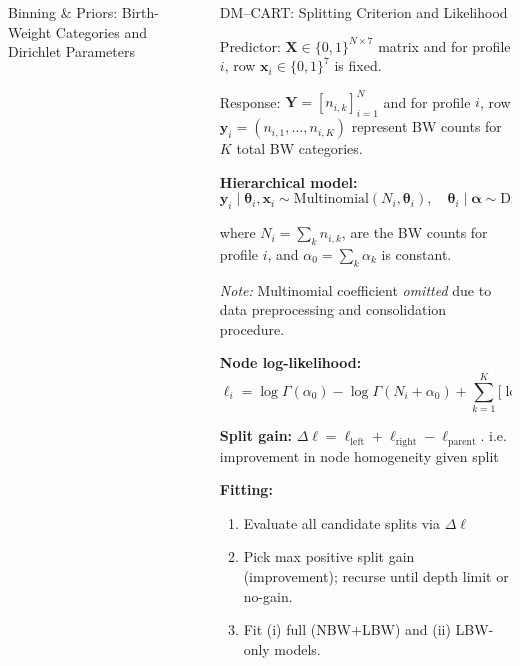 \documentclass[final]{beamer}
\newlength{\sepwidth}
\newlength{\colwidth}
\newcommand{\tightlist}{\setlength\itemsep{0.2em}\setlength\topsep{0em}\setlength\parsep{0em}}
\newcommand{\separatorcolumn}{\begin{column}{\sepwidth}\end{column}}
\begin{document}
\begin{frame}[t]
\begin{columns}[t]
\begin{column}{\colwidth}
\begin{block}{Binning \& Priors: Birth-Weight Categories and Dirichlet Parameters}
\end{block}

\end{column}

\separatorcolumn

\begin{column}{\colwidth}
\vspace{-1em}
\begin{block}{DM–CART: Splitting Criterion and Likelihood}

    Predictor: \(\mathbf{X} \in \{0,1\}^{N \times 7}\) matrix and for profile \(i\), row \(\mathbf{x}_i \in \{0,1\}^7\) is fixed.  
    
    Response: \(\mathbf{Y} = \left[n_{i,k} \right]_{i=1}^N\) and for profile \(i\), row \(\mathbf{y}_i = (n_{i,1},\dots,n_{i,K})\) represent BW counts for \(K\) total BW categories. 

    \textbf{Hierarchical model:}
    \[
      \mathbf{y}_i \mid \boldsymbol{\theta}_i, \mathbf{x}_i \sim \mathrm{Multinomial}(N_i, \boldsymbol{\theta}_i), 
      \quad \boldsymbol{\theta}_i \mid \boldsymbol{\alpha} \sim \mathrm{Dirichlet}(\alpha_1,\dots,\alpha_K)
    \]
    
    where \(N_i = \sum_k n_{i,k}\), are the BW counts for profile \(i\), and \(\alpha_0 = \sum_k \alpha_k\) is constant.

    \small
    \emph{Note:} Multinomial coefficient \emph{omitted} due to data preprocessing and consolidation procedure.
    
    \normalsize
    \textbf{Node log-likelihood:}
    \[
    \ell_i = \log \Gamma(\alpha_0) - \log\Gamma(N_i + \alpha_0) + \sum_{k=1}^K\!\big[ \log\Gamma(n_{i,k}+\alpha_k) - \log\Gamma(\alpha_k) \big]
    \]

    \textbf{Split gain:} \(\Delta \ell = \ell_{\text{left}}+\ell_{\text{right}}-\ell_{\text{parent}}\). i.e. improvement in node homogeneity given split \citep{gundersen2020dirichlet-multinomial,mimno_polya,minka2000estimating}


    \textbf{Fitting:}\vspace{-0.6em}
    \small
    \begin{enumerate}\tightlist
      \item Evaluate all candidate splits via \(\Delta \ell\)
      \item Pick max positive split gain (improvement); recurse until depth limit or no-gain.
      \item Fit (i) full (NBW+LBW) and (ii) LBW-only models.
    \end{enumerate}
\end{block}


\end{column}
\end{columns}
\end{frame}
\end{document}
